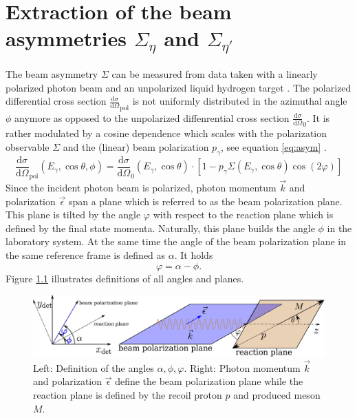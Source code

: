 
\chapter{Extraction of the beam asymmetries $\Sigma_{\eta}$ and $\Sigma_{\eta'}$}
\label{chap:sigma}
The beam asymmetry $\Sigma$ can be measured from data taken with a linearly polarized photon beam and an unpolarized liquid hydrogen target \cite{san}. The polarized differential cross section $\frac{\text{d}\sigma}{\text{d}\Omega}_\text{pol}$ is not uniformly distributed in the azimuthal angle $\phi$ anymore as opposed to the unpolarized diffenrential cross section $\frac{\text{d}\sigma}{\text{d}\Omega}_0$. It is rather modulated by a cosine dependence which scales with the polarization observable $\Sigma$ and the (linear) beam polarization $p_\gamma$, see equation \eqref{eq:asym} \cite{san}.
\begin{equation}
	\frac{\text{d}\sigma}{\text{d}\Omega}_\text{pol}\left(E_\gamma,\cos\theta,\phi\right)=\frac{\text{d}\sigma}{\text{d}\Omega}_0\left(E_\gamma,\cos\theta\right)\cdot\left[1-p_\gamma\Sigma\left(E_\gamma,\cos\theta\right)\cos\left(2\varphi\right)\right]
	\label{eq:asym}
\end{equation}
Since the incident photon beam is polarized, photon momentum $\vec{k}$ and polarization $\vec{\epsilon}$ span a plane which is referred to as the beam polarization plane. This plane is tilted by the angle $\varphi$ with respect to the reaction plane which is defined by the final state momenta. Naturally, this plane builds the angle $\phi$ in the laboratory system. At the same time the angle of the beam polarization plane in the same reference frame is defined as $\alpha$. It holds 
\begin{equation}
	\varphi=\alpha-\phi.
\end{equation} Figure \ref{fig:angles} illustrates definitions of all angles and planes. 
 \begin{figure}[htbp]
	\centering
	\includegraphics[width=\linewidth]{../DPG2022/figs/angles.pdf}
	\caption{Left: Definition of the angles $\alpha,\phi,\varphi$. Right: Photon momentum $\vec{k}$ and polarization  $\vec{\epsilon}$ define the beam polarization plane while the reaction plane is defined by the recoil proton $p$ and produced meson $M$.}
	\label{fig:angles}
\end{figure} 
